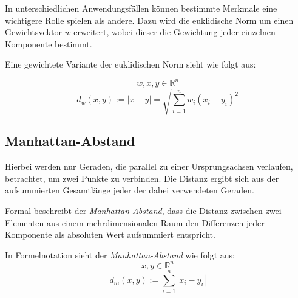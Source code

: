 \documentclass[fontsize=11pt]{scrartcl}
\begin{document}
                In unterschiedlichen Anwendungsfällen können bestimmte Merkmale eine wichtigere Rolle spielen als andere.\cite{ertel2016_p207} Dazu wird die euklidische Norm um einen Gewichtsvektor $w$ erweitert, wobei dieser die Gewichtung jeder einzelnen Komponente bestimmt.\par Eine gewichtete Variante der euklidischen Norm sieht wie folgt aus:\par
                $$
                    w,x,y \in \mathbb{R}^n
                $$
                $$
                    d_w(x,y):= |x - y| = \sqrt{\sum_{i=1}^{n}w_i(x_i -y_i)^2}
                $$     

            
            \subsection{Manhattan-Abstand}
                Hierbei werden nur Geraden, die parallel zu einer Ursprungsachsen verlaufen, betrachtet, um zwei Punkte zu verbinden. Die Distanz ergibt sich aus der aufsummierten Gesamtlänge jeder der dabei verwendeten Geraden.\par 
                Formal beschreibt der \emph{Manhattan-Abstand}, dass die Distanz zwischen zwei Elementen aus einem mehrdimensionalen Raum den Differenzen jeder Komponente als absoluten Wert aufsummiert entspricht.\par %

				
                In Formelnotation sieht der \emph{Manhattan-Abstand} wie folgt aus:
                $$
                    x,y \in \mathbb{R}^n 
                $$
                $$
                    d_m(x,y):= \sum_{i=1}^{n} |x_i -y_i|
                $$
\end{document}
